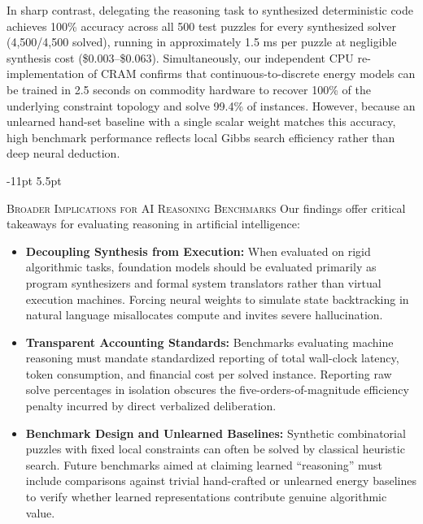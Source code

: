 \documentclass{article} %
\makeatletter
\renewcommand\subsection{\@startsection{subsection}{2}{\z@}%
  {-11pt \@plus -3pt \@minus -2pt}%
  {5.5pt \@plus 2pt}%
  {\normalfont\fontsize{10}{12}\selectfont\scshape\raggedright}}
\makeatother
\begin{document}
In sharp contrast, delegating the reasoning task to synthesized deterministic code achieves 100\% accuracy across all 500 test puzzles for every synthesized solver (4,500/4,500 solved), running in approximately 1.5 ms per puzzle at negligible synthesis cost (\$0.003--\$0.063). Simultaneously, our independent CPU re-implementation of CRAM confirms that continuous-to-discrete energy models can be trained in 2.5 seconds on commodity hardware to recover 100\% of the underlying constraint topology and solve 99.4\% of instances. However, because an unlearned hand-set baseline with a single scalar weight matches this accuracy, high benchmark performance reflects local Gibbs search efficiency rather than deep neural deduction.

\subsection{\textsc{Broader Implications for AI Reasoning Benchmarks}}
Our findings offer critical takeaways for evaluating reasoning in artificial intelligence:
\begin{itemize}
    \item \textbf{Decoupling Synthesis from Execution:} When evaluated on rigid algorithmic tasks, foundation models should be evaluated primarily as program synthesizers and formal system translators rather than virtual execution machines. Forcing neural weights to simulate state backtracking in natural language misallocates compute and invites severe hallucination.
    \item \textbf{Transparent Accounting Standards:} Benchmarks evaluating machine reasoning must mandate standardized reporting of total wall-clock latency, token consumption, and financial cost per solved instance. Reporting raw solve percentages in isolation obscures the five-orders-of-magnitude efficiency penalty incurred by direct verbalized deliberation.
    \item \textbf{Benchmark Design and Unlearned Baselines:} Synthetic combinatorial puzzles with fixed local constraints can often be solved by classical heuristic search. Future benchmarks aimed at claiming learned ``reasoning'' must include comparisons against trivial hand-crafted or unlearned energy baselines to verify whether learned representations contribute genuine algorithmic value.
\end{itemize}




\clearpage
\appendix
\end{document}
